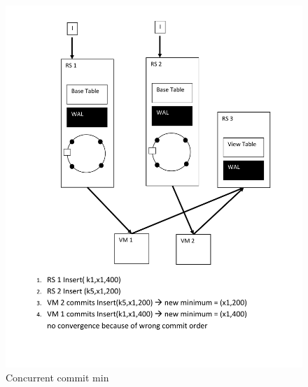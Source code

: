 \begin{figure}[h!]
  \centering
    \includegraphics[scale=0.8]{figures/CO_ConcurrentCommitMin}
     \caption{Concurrent commit min}
    \label{fig:co_concurrentcommitmin}
\end{figure}
\newpage

